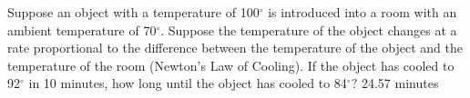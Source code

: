 {
Suppose an object with a temperature of 100$^\circ$ is introduced into a room with an ambient temperature of 70$^\circ$.  Suppose the temperature of the object changes at a rate proportional to the difference between the temperature of the object and the temperature of the room (Newton's Law of Cooling).  If the object has cooled to 92$^\circ$ in 10 minutes, how long until the object has cooled to 84$^\circ?$ 
}
{
24.57 minutes
}
